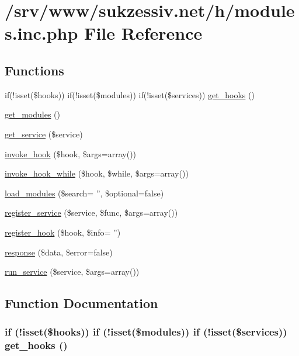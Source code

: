 \hypertarget{modules_8inc_8php}{
\section{/srv/www/sukzessiv.net/h/modules.inc.php File Reference}
\label{modules_8inc_8php}
}
\subsection*{Functions}
\begin{CompactItemize}
\item 
if(!isset(\$hooks)) if(!isset(\$modules)) if(!isset(\$services)) \hyperlink{modules_8inc_8php_dcaa12e356133b7fa0670571698b38cc}{get\_\-hooks} ()
\item 
\hyperlink{modules_8inc_8php_1b73e435e11b07906d0781b146b4aa21}{get\_\-modules} ()
\item 
\hyperlink{modules_8inc_8php_bf7633223c2fd4ecb199a8e0dc070802}{get\_\-service} (\$service)
\item 
\hyperlink{modules_8inc_8php_3318fb85bac26e6fb2397c6ea9f02322}{invoke\_\-hook} (\$hook, \$args=array())
\item 
\hyperlink{modules_8inc_8php_66473fc9f24153d85053f1f9c6ed83e4}{invoke\_\-hook\_\-while} (\$hook, \$while, \$args=array())
\item 
\hyperlink{modules_8inc_8php_23f8be02dc2148a3c860119a1d6ea276}{load\_\-modules} (\$search= '', \$optional=false)
\item 
\hyperlink{modules_8inc_8php_e6ed600fb2ce39a4b0837bbb01fe8d6e}{register\_\-service} (\$service, \$func, \$args=array())
\item 
\hyperlink{modules_8inc_8php_d91a5f96df0655d782404170324e567d}{register\_\-hook} (\$hook, \$info= '')
\item 
\hyperlink{modules_8inc_8php_361058ff2a03c098045c4442440a2574}{response} (\$data, \$error=false)
\item 
\hyperlink{modules_8inc_8php_3d581f1636df2e24ffe7b013a12fb1db}{run\_\-service} (\$service, \$args=array())
\end{CompactItemize}


\subsection{Function Documentation}
\hypertarget{modules_8inc_8php_dcaa12e356133b7fa0670571698b38cc}{
\subsubsection[{get\_\-hooks}]{\setlength{\rightskip}{0pt plus 5cm}if (!isset(\$hooks)) if (!isset(\$modules)) if (!isset(\$services)) get\_\-hooks ()}}
\label{modules_8inc_8php_dcaa12e356133b7fa0670571698b38cc}


